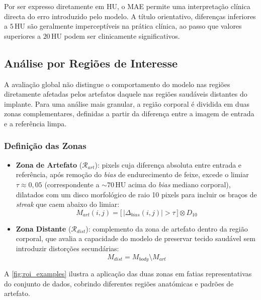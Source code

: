 Por ser expresso diretamente em HU, o MAE permite uma interpretação clínica directa do erro introduzido pelo modelo. A título orientativo, diferenças inferiores a $5\,\text{HU}$ são geralmente imperceptíveis na prática clínica, ao passo que valores superiores a $20\,\text{HU}$ podem ser clinicamente significativos.

\subsection{Análise por Regiões de Interesse}

A avaliação global não distingue o comportamento do modelo nas regiões diretamente afetadas pelos artefatos daquele nas regiões saudáveis distantes do implante. Para uma análise mais granular, a região corporal é dividida em duas zonas complementares, definidas a partir da diferença entre a imagem de entrada e a referência limpa.

\subsubsection{Definição das Zonas}

\begin{itemize}
    \item \textbf{Zona de Artefato} ($\mathcal{R}_{art}$): pixels cuja diferença absoluta entre entrada e referência, após remoção do \textit{bias} de endurecimento de feixe, excede o limiar $\tau \approx 0{,}05$ (correspondente a $\sim\!70\,\text{HU}$ acima do \textit{bias} mediano corporal), dilatados com um disco morfológico de raio 10 pixels para incluir os braços de \textit{streak} que caem abaixo do limiar:
    \[
    M_{art}(i,j) = \bigl[\,|\Delta_{bias}(i,j)| > \tau\,\bigr] \otimes D_{10}
    \]
    \item \textbf{Zona Distante} ($\mathcal{R}_{dist}$): complemento da zona de artefato dentro da região corporal, que avalia a capacidade do modelo de preservar tecido saudável sem introduzir distorções secundárias:
    \[
    M_{dist} = M_{body} \setminus M_{art}
    \]
\end{itemize}

A \autoref{fig:roi_examples} ilustra a aplicação das duas zonas em fatias representativas do conjunto de dados, cobrindo diferentes regiões anatómicas e padrões de artefato.

